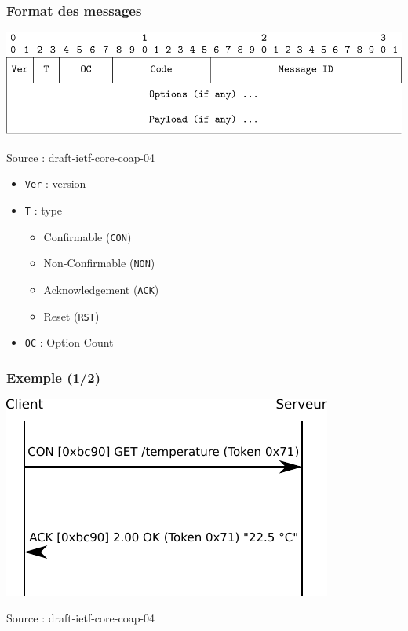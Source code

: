 \documentclass{beamer}
\begin{document}
\begin{frame}
  \frametitle{Format des messages}
  \includegraphics[width=\textwidth]{coap_packet}
  \begin{center}
    \tiny Source : draft-ietf-core-coap-04
  \end{center}
  \begin{itemize}
  \item \texttt{Ver} : version
  \item \texttt{T} : type
    \begin{itemize}
    \item Confirmable (\texttt{CON})
    \item Non-Confirmable (\texttt{NON})
    \item Acknowledgement (\texttt{ACK})
    \item Reset (\texttt{RST})
    \end{itemize}
  \item \texttt{OC} : Option Count
  \end{itemize}
\end{frame}

\begin{frame}
  \frametitle{Exemple (1/2)}
  \includegraphics[width=\textwidth]{ex1}
  \begin{center}
    \tiny Source : draft-ietf-core-coap-04
  \end{center}
\end{frame}
\end{document}
